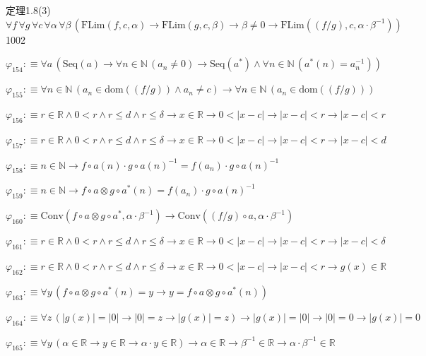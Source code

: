 \begin{fullproof}{定理1.8(3)}{$\forall f\,\forall g\,\forall c\,\forall \alpha\,\forall \beta\,(\mathrm{FLim}(f,c,\alpha) \to \mathrm{FLim}(g,c,\beta) \to \beta \neq 0 \to \mathrm{FLim}((f / g),c,\alpha \cdot \beta^{-1}))$}{1002}
\begin{abbrevlist}
\item $\varphi_{154} :\equiv \forall a\,(\mathrm{Seq}(a) \to \forall n \in \mathbb{N}\,(a_{n} \neq 0) \to \mathrm{Seq}(a^{\ast}) \land \forall n \in \mathbb{N}\,(a^{\ast}(n) = a_{n}^{-1}))$
\item $\varphi_{155} :\equiv \forall n \in \mathbb{N}\,(a_{n} \in \mathrm{dom}((f / g)) \land a_{n} \neq c) \to \forall n \in \mathbb{N}\,(a_{n} \in \mathrm{dom}((f / g)))$
\item $\varphi_{156} :\equiv r \in \mathbb{R} \land 0 < r \land r \leq d \land r \leq \delta \to x \in \mathbb{R} \to 0 < \lvert x - c \rvert \to \lvert x - c \rvert < r \to \lvert x - c \rvert < r$
\item $\varphi_{157} :\equiv r \in \mathbb{R} \land 0 < r \land r \leq d \land r \leq \delta \to x \in \mathbb{R} \to 0 < \lvert x - c \rvert \to \lvert x - c \rvert < r \to \lvert x - c \rvert < d$
\item $\varphi_{158} :\equiv n \in \mathbb{N} \to f \circ a(n) \cdot g \circ a(n)^{-1} = f(a_{n}) \cdot g \circ a(n)^{-1}$
\item $\varphi_{159} :\equiv n \in \mathbb{N} \to f \circ a \otimes g \circ a^{\ast}(n) = f(a_{n}) \cdot g \circ a(n)^{-1}$
\item $\varphi_{160} :\equiv \mathrm{Conv}(f \circ a \otimes g \circ a^{\ast},\alpha \cdot \beta^{-1}) \to \mathrm{Conv}((f / g) \circ a,\alpha \cdot \beta^{-1})$
\item $\varphi_{161} :\equiv r \in \mathbb{R} \land 0 < r \land r \leq d \land r \leq \delta \to x \in \mathbb{R} \to 0 < \lvert x - c \rvert \to \lvert x - c \rvert < r \to \lvert x - c \rvert < \delta$
\item $\varphi_{162} :\equiv r \in \mathbb{R} \land 0 < r \land r \leq d \land r \leq \delta \to x \in \mathbb{R} \to 0 < \lvert x - c \rvert \to \lvert x - c \rvert < r \to g(x) \in \mathbb{R}$
\item $\varphi_{163} :\equiv \forall y\,(f \circ a \otimes g \circ a^{\ast}(n) = y \to y = f \circ a \otimes g \circ a^{\ast}(n))$
\item $\varphi_{164} :\equiv \forall z\,(\lvert g(x) \rvert = \lvert 0 \rvert \to \lvert 0 \rvert = z \to \lvert g(x) \rvert = z) \to \lvert g(x) \rvert = \lvert 0 \rvert \to \lvert 0 \rvert = 0 \to \lvert g(x) \rvert = 0$
\item $\varphi_{165} :\equiv \forall y\,(\alpha \in \mathbb{R} \to y \in \mathbb{R} \to \alpha \cdot y \in \mathbb{R}) \to \alpha \in \mathbb{R} \to \beta^{-1} \in \mathbb{R} \to \alpha \cdot \beta^{-1} \in \mathbb{R}$

\end{abbrevlist}
\end{fullproof}
